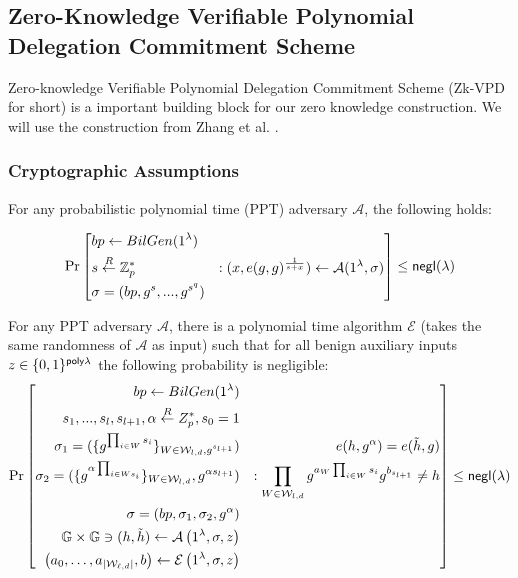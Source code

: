 
\subsection{Zero-Knowledge Verifiable Polynomial Delegation Commitment Scheme}

Zero-knowledge Verifiable Polynomial Delegation Commitment Scheme (Zk-VPD for short) is a important building block for our zero knowledge construction. We will use the construction from Zhang et al. \cite{zkvpd}.

\subsubsection{Cryptographic Assumptions}

\begin{assumption}
	\label{asp::qSDH}
	For any probabilistic polynomial time (PPT) adversary $\mathcal{A}$, the following holds:

	\[\Pr\left[ \begin{aligned}
		&bp \leftarrow BilGen(1^\lambda) & \\
		&s \overset{R}{\leftarrow} \mathbb{Z}^{*}_{p} & : (x, e(g, g)^{\frac{1}{s+x}}) \leftarrow \mathcal{A}(1^\lambda, \sigma)\\
		&\sigma = (bp, g^s, ..., g^{s^q})
	\end{aligned} \right] \le {\sf negl}{(\lambda)}\]
\end{assumption}
\begin{assumption}
	\label{asp::dlEPKE}
	For any PPT adversary $\mathcal{A}$, there is a polynomial time algorithm $\mathcal{E}$ (takes the same randomness of $\mathcal{A}$ as input) such that for all benign auxiliary inputs $z \in \{0,1\}^{{\sf poly}{\lambda}}$ the following probability is negligible:
	\[\Pr\left[ \begin{aligned}
					bp \leftarrow BilGen(1^\lambda) && \\
					s_1, ..., s_l, s_{l + 1}, \alpha \overset{R}{\leftarrow} Z_{p}^*, s_0=1 && \\
					\sigma_1 = (\{g^{\prod_{i\in W}s_i}\}_{W\in \mathcal{W}_{l, d}, g^{s_{l+1}}}) &&\hspace*{10pt} e(h, g^\alpha)=e(\tilde{h}, g)\\
					\sigma_2 = (\{g^{\alpha\prod_{i\in Ws_i}}\}_{W\in \mathcal{W}_{l, d}}, g^{\alpha s_{l+1}}) && : \prod_{W\in \mathcal{W}_{l, d}}g^{a_{W}\prod_{i\in W}s_i}g^{b_{s_{l+1}}}\neq h\\
					\sigma = (bp, \sigma_1, \sigma_2, g^{\alpha}) && \\
					\mathbb{G} \times \mathbb{G} \ni (h, \tilde{h}) \leftarrow \mathcal{A} \left(1^{\lambda}, \sigma, z\right)&& \\
					\left( a _ { 0 } , \dots , a _ { \left| \mathcal { W } _ { \ell , d } \right| } , b \right) \leftarrow \mathcal { E } \left( 1 ^ { \lambda } , \sigma , z \right) &&
				\end{aligned}\right] \le {\sf negl}{(\lambda)}\]
\end{assumption}

